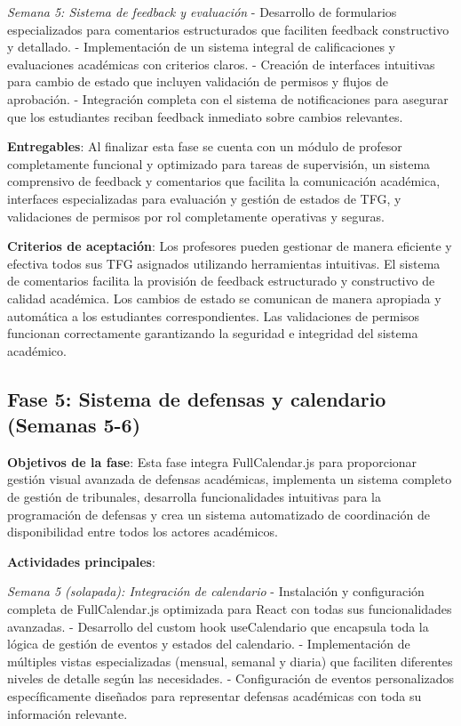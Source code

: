 \documentclass[12pt,a4paper,oneside]{report}
\begin{document}
\emph{Semana 5: Sistema de feedback y evaluación} - Desarrollo de formularios especializados para comentarios estructurados que faciliten feedback constructivo y detallado. - Implementación de un sistema integral de calificaciones y evaluaciones académicas con criterios claros. - Creación de interfaces intuitivas para cambio de estado que incluyen validación de permisos y flujos de aprobación. - Integración completa con el sistema de notificaciones para asegurar que los estudiantes reciban feedback inmediato sobre cambios relevantes.

\textbf{Entregables}: Al finalizar esta fase se cuenta con un módulo de profesor completamente funcional y optimizado para tareas de supervisión, un sistema comprensivo de feedback y comentarios que facilita la comunicación académica, interfaces especializadas para evaluación y gestión de estados de TFG, y validaciones de permisos por rol completamente operativas y seguras.

\textbf{Criterios de aceptación}: Los profesores pueden gestionar de manera eficiente y efectiva todos sus TFG asignados utilizando herramientas intuitivas. El sistema de comentarios facilita la provisión de feedback estructurado y constructivo de calidad académica. Los cambios de estado se comunican de manera apropiada y automática a los estudiantes correspondientes. Las validaciones de permisos funcionan correctamente garantizando la seguridad e integridad del sistema académico.

\subsection{Fase 5: Sistema de defensas y calendario (Semanas
5-6)}\label{fase-5-sistema-de-defensas-y-calendario-semanas-5-6}

\textbf{Objetivos de la fase}: Esta fase integra FullCalendar.js para proporcionar gestión visual avanzada de defensas académicas, implementa un sistema completo de gestión de tribunales, desarrolla funcionalidades intuitivas para la programación de defensas y crea un sistema automatizado de coordinación de disponibilidad entre todos los actores académicos.

\textbf{Actividades principales}:

\emph{Semana 5 (solapada): Integración de calendario} - Instalación y configuración completa de FullCalendar.js optimizada para React con todas sus funcionalidades avanzadas. - Desarrollo del custom hook useCalendario que encapsula toda la lógica de gestión de eventos y estados del calendario. - Implementación de múltiples vistas especializadas (mensual, semanal y diaria) que faciliten diferentes niveles de detalle según las necesidades. - Configuración de eventos personalizados específicamente diseñados para representar defensas académicas con toda su información relevante.
\end{document}
